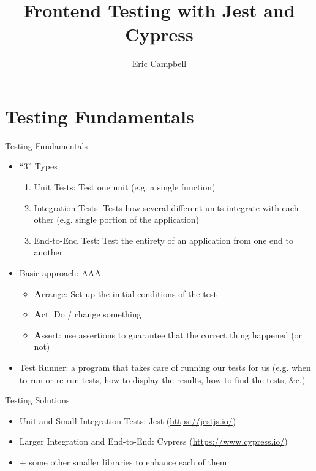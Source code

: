 \documentclass[t]{beamer}
\title{Frontend Testing with Jest and Cypress}
\author{Eric Campbell}
\date{}
\begin{document}
	\begin{frame}
		\maketitle
	\end{frame}

	\section{Testing Fundamentals}
	\begin{frame}{Testing Fundamentals}
		\begin{itemize}
			\item ``3'' Types
				\begin{enumerate}
					\item Unit Tests: Test one unit (e.g. a single function)
					\item Integration Tests: Tests how several different units integrate with each other (e.g.  single portion of the application)
					\item End-to-End Test: Test the entirety of an application from one end to another
				\end{enumerate}
			\item Basic approach: AAA
				\begin{itemize}
					\item \textbf{A}rrange: Set up the initial conditions of the test
					\item \textbf{A}ct: Do / change something
					\item \textbf{A}ssert: use assertions to guarantee that the correct thing happened (or not)
				\end{itemize}
			\item Test Runner:  a program that takes care of running our tests for us (e.g. when to run or re-run tests, how to display the results, how to find the tests, \&c.)
		\end{itemize}
	\end{frame}

	\begin{frame}{Testing Solutions}
		\begin{itemize}
			\item Unit and Small Integration Tests: Jest (\url{https://jestjs.io/})
			\item Larger Integration and End-to-End: Cypress (\url{https://www.cypress.io/})
			\item $+$ some other smaller libraries to enhance each of them
		\end{itemize}
	\end{frame}
\end{document}

